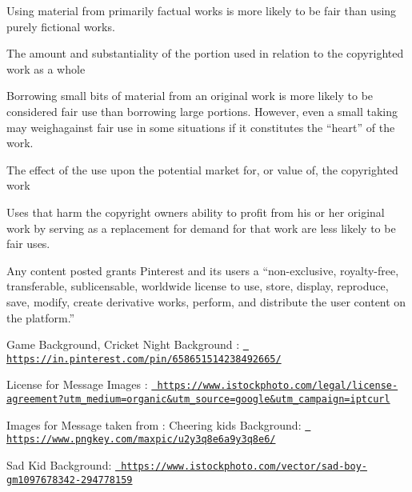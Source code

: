 Using material from primarily factual works is more likely to be fair than using purely fictional works.


\begin{DoxyEnumerate}
\item The amount and substantiality of the portion used in relation to the copyrighted work as a whole
\end{DoxyEnumerate}

Borrowing small bits of material from an original work is more likely to be considered fair use than borrowing large portions. However, even a small taking may weighagainst fair use in some situations if it constitutes the “heart” of the work.


\begin{DoxyEnumerate}
\item The effect of the use upon the potential market for, or value of, the copyrighted work
\end{DoxyEnumerate}

Uses that harm the copyright owner\textquotesingle{}s ability to profit from his or her original work by serving as a replacement for demand for that work are less likely to be fair uses.

Any content posted grants Pinterest and its users a “non-\/exclusive, royalty-\/free, transferable, sublicensable, worldwide license to use, store, display, reproduce, save, modify, create derivative works, perform, and distribute the user content on the platform.\+”

Game Background, Cricket Night Background \+: \href{https://in.pinterest.com/pin/658651514238492665/}{\texttt{ https\+://in.\+pinterest.\+com/pin/658651514238492665/}} 


License for Message Images \+: \href{https://www.istockphoto.com/legal/license-agreement?utm_medium=organic&utm_source=google&utm_campaign=iptcurl}{\texttt{ https\+://www.\+istockphoto.\+com/legal/license-\/agreement?utm\+\_\+medium=organic\&utm\+\_\+source=google\&utm\+\_\+campaign=iptcurl}}

Images for Message taken from \+: Cheering kids Background\+: \href{https://www.pngkey.com/maxpic/u2y3q8e6a9y3q8e6/}{\texttt{ https\+://www.\+pngkey.\+com/maxpic/u2y3q8e6a9y3q8e6/}}

Sad Kid Background\+: \href{https://www.istockphoto.com/vector/sad-boy-gm1097678342-294778159}{\texttt{ https\+://www.\+istockphoto.\+com/vector/sad-\/boy-\/gm1097678342-\/294778159}} 


